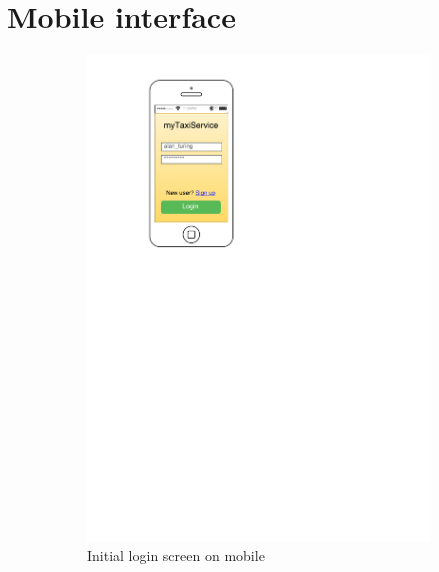\section{Mobile interface}

\begin{figure}
    \centering
    \begin{subfigure}{0.45\textwidth}
        \centering
        \includegraphics[width=\textwidth]{mockup/app/MobileLogin}
        \caption{Initial login screen on mobile}
        \label{fig:mockup-login-mobile}
    \end{subfigure}
    \begin{subfigure}{0.45\textwidth}
        \centering

\end{subfigure}
\end{figure}
